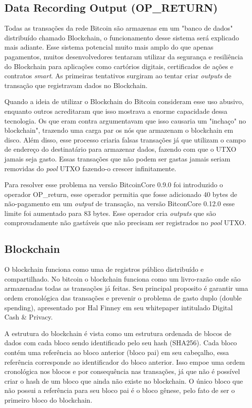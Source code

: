 \documentclass[conference,compsoc]{IEEEtran}
\begin{document}
\subsection*{Data Recording Output (OP\_RETURN)}

Todas as transações da rede Bitcoin são armazenas em um "banco de dados" distribuído chamado Blockchain, o funcionamento desse sistema será explicado mais adiante. Esse sistema potencial muito mais amplo do que apenas pagamentos, muitos desenvolvedores tentaram utilizar da segurança e resiliência do Blockchain para aplicações como cartórios digitais, certificados de ações e contratos \textit{smart}. As primeiras tentativos surgiram ao tentar criar \textit{outputs} de transação que registravam dados no Blockchain.

Quando a ideia de utilizar o Blockchain do Bitcoin  consideram esse uso abusivo, enquanto outros acreditaram que isso mostrava a enorme capacidade dessa tecnologia. Os que eram contra argumentavam que isso causaria um "inchaço" no blockchain", trazendo uma carga par os nós que armazenam o blockchain em disco. Além disso, esse processo criaria  falsas transações já que utilizam o campo de endereço do destinatário para armazenar dados, fazendo com que o UTXO jamais seja gasto. Essas transações que não podem ser gastas jamais seriam removidas do \textit{pool} UTXO fazendo-o crescer infinitamente. 

Para resolver esse problema na versão BitcoinCore 0.9.0 foi introduzido o operador OP\_return, esse operador permitia que fosse adicionado 40 bytes de não-pagamento em um \textit{output} de transação, na versão BitconCore 0.12.0 esse limite foi aumentado para 83 bytes. Esse operador cria \textit{outputs} que são comprovadamente não gastáveis que não precisam ser registrados no \textit{pool} UTXO.


\subsection{Blockchain}
O blockchain funciona como uma de registros público distribuído e compartilhado. No bitcoin o blockchain funciona como um livro-razão onde são armazenadas todas as transações já feitas. Seu principal proposito é garantir uma ordem cronológica das transações e prevenir o problema de gasto duplo (double spending), apresentado por Hal Finney em seu whitepaper intitulado Digital Cash \& Privacy. 

A estrutura do blockchain é vista como um estrutura ordenada de blocos de dados com cada bloco sendo identificado pelo seu hash (SHA256). Cada bloco contém uma referência ao bloco anterior (bloco pai) em seu cabeçalho, essa referência corresponde ao identificador do bloco anterior. Isso empoe uma ordem cronológica nos blocos e por consequência nas transações, já que não é possível criar o hash de um bloco que ainda não existe no blockchain. O único bloco que não possui a referência para seu bloco pai é o bloco gênese, pelo fato de ser o primeiro bloco do blockchain. 
\end{document}
